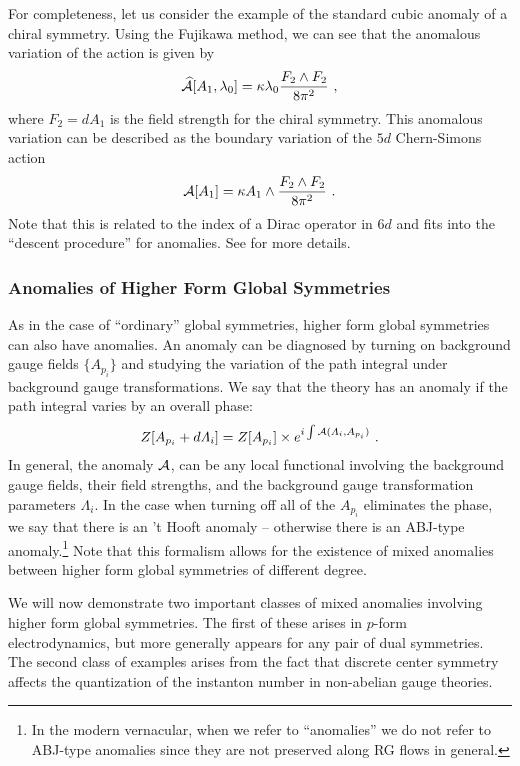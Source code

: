 \documentclass[11pt]{article}
\newcommand{\eq}[1]{\begin{align}\begin{split}#1\end{split}\end{align}}
\def\CA{{\cal A}}
\begin{document}
For completeness, let us consider the example of the standard cubic anomaly of a chiral symmetry. Using the Fujikawa method, we can see that the anomalous variation of the action is given by 
\eq{
\widehat\CA[A_1,\lambda_0]=\kappa \lambda_0\frac{F_2\wedge F_2}{8\pi^2}~, 
}
where $F_2=dA_1$ is the field strength for the chiral symmetry. This anomalous variation can be described as the boundary variation of the $5d$ Chern-Simons action 
\eq{
\CA[A_1]=\kappa A_1\wedge \frac{F_2\wedge F_2}{8\pi^2}~. 
}
Note that this is related to the index of a Dirac operator in $6d$ and fits into the ``descent procedure'' for anomalies. See \cite{Callan:1984sa, Witten:2019bou, Harvey:2005it, Weinberg:1996kr, Hong:2020bvq} for more details. 


\subsubsection{Anomalies of Higher Form Global Symmetries}

As in the case of ``ordinary'' global symmetries, higher form global symmetries can also have anomalies. An anomaly can be diagnosed by turning on background gauge fields $\{A_{p_i}\}$ and studying the variation of the path integral under background gauge transformations. We say that the theory has an anomaly if the path integral varies by an overall phase:
\eq{
Z[A_{p_i}+d\Lambda_{i}]=Z[A_{p_i}]\times e^{i \int \CA(\Lambda_i,A_{p_i})}~.
}
In general, the anomaly $\CA$, can be any local functional involving the background gauge fields, their field strengths, and the background gauge transformation parameters $\Lambda_i$. In the case when turning off all of the $A_{p_i}$ eliminates the phase, we say that there is an 't Hooft anomaly -- otherwise there is an ABJ-type anomaly.\footnote{In the modern vernacular, when we refer to ``anomalies'' we do not refer to  ABJ-type anomalies since they are not preserved along RG flows in general. } Note that this formalism allows for the existence of  mixed anomalies between higher form global symmetries of different degree. 


We will now demonstrate two important classes of mixed anomalies involving higher form global symmetries. 
The first of these arises in $p$-form electrodynamics, but more generally appears for any pair of dual symmetries.   The second class of examples arises from the fact that discrete center symmetry affects the quantization of the instanton number in non-abelian gauge theories. 
\end{document}
